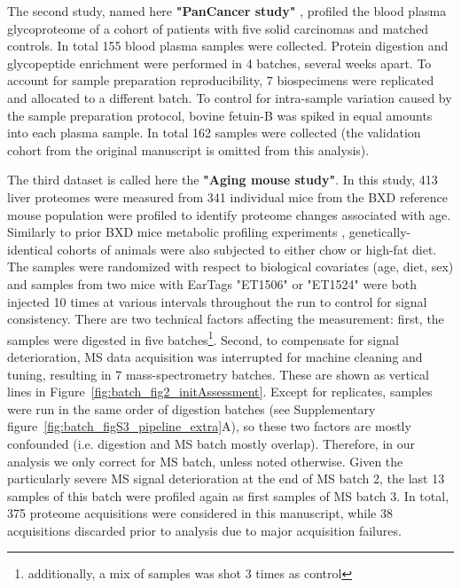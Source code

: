 \documentclass[num-refs]{wiley-article}
\begin{document}
The second study, named here \textbf{"PanCancer study"} \cite{Sajic2018}, profiled the blood plasma glycoproteome of a cohort of patients with five solid carcinomas and matched controls. In total 155 blood plasma samples were collected. Protein digestion and glycopeptide enrichment were performed in 4 batches, several weeks apart. To account for sample preparation reproducibility, 7 biospecimens were replicated and allocated to a different batch. To control for intra-sample variation caused by the sample preparation protocol, bovine fetuin-B was spiked in equal amounts into each plasma sample. In total 162 samples were collected (the validation cohort from the original manuscript is omitted from this analysis).

The third dataset is called here the \textbf{"Aging mouse study"}. In this study, 413 liver proteomes were measured from 341 individual mice from the BXD reference mouse population \cite{Peirce:2004aa} were profiled to identify proteome changes associated with age. Similarly to prior BXD mice metabolic profiling experiments \cite{Williams:2016aa}, genetically-identical cohorts of animals were also subjected to either chow or high-fat diet. The samples were randomized with respect to biological covariates (age, diet, sex) and samples from two mice with EarTags "ET1506" or "ET1524" were both injected 10 times at various intervals throughout the run to control for signal consistency. There are two technical factors affecting the measurement: first, the samples were digested in five batches\footnote{additionally, a mix of samples was shot 3 times as control}. Second, to compensate for signal deterioration, MS data acquisition was interrupted for machine cleaning and tuning, resulting in 7 mass-spectrometry batches. These are shown as vertical lines in Figure~\ref{fig:batch_fig2_initAssessment}. Except for replicates, samples were run in the same order of digestion batches (see Supplementary figure~\ref{fig:batch_figS3_pipeline_extra}A), so these two factors are mostly confounded (i.e. digestion and MS batch mostly overlap). Therefore, in our analysis we only correct for MS batch, unless noted otherwise. Given the particularly severe MS signal deterioration at the end of MS batch 2, the last 13 samples of this batch were profiled again as first samples of MS batch 3. In total, 375 proteome acquisitions were considered in this manuscript, while 38 acquisitions discarded prior to analysis due to major acquisition failures. 
\end{document}
